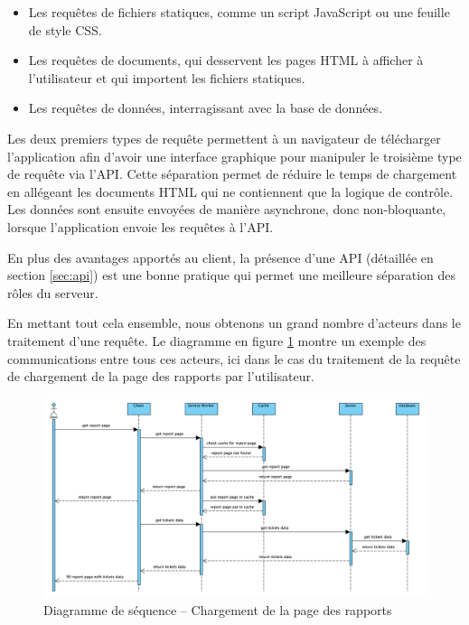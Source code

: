 \documentclass{EPL-master-thesis-covers-FR}
\begin{document}
				\begin{itemize}
					\item Les requêtes de fichiers statiques, comme un script JavaScript ou une feuille de style CSS.
					\item Les requêtes de documents, qui desservent les pages HTML à afficher à l'utilisateur et qui importent les fichiers statiques.
					\item Les requêtes de données, interragissant avec la base de données.
				\end{itemize}

				Les deux premiers types de requête permettent à un navigateur de télécharger l'application afin d'avoir une interface graphique pour manipuler le troisième type de requête via l'API. Cette séparation permet de réduire le temps de chargement en allégeant les documents HTML qui ne contiennent que la logique de contrôle. Les données sont ensuite envoyées de manière asynchrone, donc non-bloquante, lorsque l'application envoie les requêtes à l'API.

				En plus des avantages apportés au client, la présence d'une API (détaillée en section \ref{sec:api}) est une bonne pratique qui permet une meilleure séparation des rôles du serveur.

				En mettant tout cela ensemble, nous obtenons un grand nombre d'acteurs dans le traitement d'une requête. Le diagramme en figure \ref{fig:sequence} montre un exemple des communications entre tous ces acteurs, ici dans le cas du traitement de la requête de chargement de la page des rapports par l'utilisateur.

				\begin{figure}
					\includegraphics[width=\textwidth]{images/sequence}
					\caption{Diagramme de séquence -- Chargement de la page des rapports}
					\label{fig:sequence}
				\end{figure}
\end{document}
